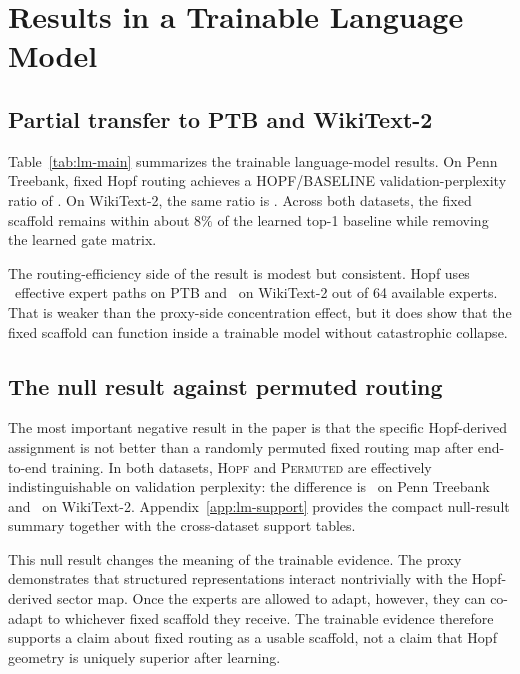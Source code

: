 \documentclass[11pt,letterpaper]{article}
\begin{document}
\section{Results in a Trainable Language Model}
\subsection{Partial transfer to PTB and WikiText-2}
Table~\ref{tab:lm-main} summarizes the trainable language-model results. On Penn Treebank, fixed Hopf routing achieves a HOPF/BASELINE validation-perplexity ratio of \PaperPTBHopfBaselineRatio. On WikiText-2, the same ratio is \PaperWTTwoHopfBaselineRatio. Across both datasets, the fixed scaffold remains within about $8\%$ of the learned top-1 baseline while removing the learned gate matrix.

\begin{table}[t]
  \centering
  \caption{Main trainable-model result. Fixed geometric routing remains usable in a two-layer language model on both PTB and WikiText-2, but it does not improve over the permuted fixed-routing null.}
  \label{tab:lm-main}
  \small
  
\end{table}

The routing-efficiency side of the result is modest but consistent. Hopf uses \PaperPTBHopfEff\ effective expert paths on PTB and \PaperWTTwoHopfEff\ on WikiText-2 out of 64 available experts. That is weaker than the proxy-side concentration effect, but it does show that the fixed scaffold can function inside a trainable model without catastrophic collapse.

\subsection{The null result against permuted routing}
\label{sec:null}
The most important negative result in the paper is that the specific Hopf-derived assignment is not better than a randomly permuted fixed routing map after end-to-end training. In both datasets, \textsc{Hopf} and \textsc{Permuted} are effectively indistinguishable on validation perplexity: the difference is \PaperPTBHopfPermDelta\ on Penn Treebank and \PaperWTTwoHopfPermDelta\ on WikiText-2. Appendix~\ref{app:lm-support} provides the compact null-result summary together with the cross-dataset support tables.

This null result changes the meaning of the trainable evidence. The proxy demonstrates that structured representations interact nontrivially with the Hopf-derived sector map. Once the experts are allowed to adapt, however, they can co-adapt to whichever fixed scaffold they receive. The trainable evidence therefore supports a claim about fixed routing as a usable scaffold, not a claim that Hopf geometry is uniquely superior after learning.
\end{document}
